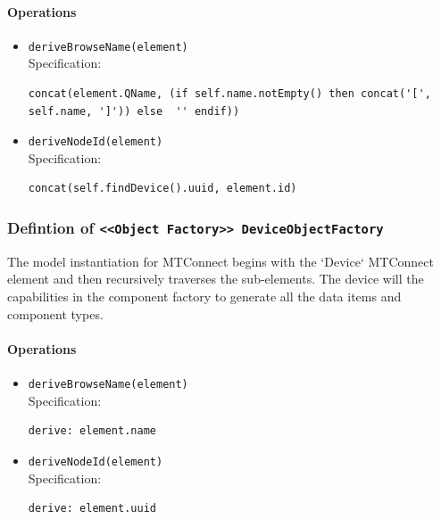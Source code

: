 \paragraph{Operations}
\begin{itemize}
  \item \texttt{deriveBrowseName(element)}\\
    Specification:
   \indent \begin{lstlisting}
concat(element.QName, (if self.name.notEmpty() then concat('[', self.name, ']')) else  '' endif))
\end{lstlisting}

  \item \texttt{deriveNodeId(element)}\\
    Specification:
   \indent \begin{lstlisting}
concat(self.findDevice().uuid, element.id)
\end{lstlisting}

\end{itemize}
\FloatBarrier
\subsubsection{Defintion of \texttt{<<Object Factory>> DeviceObjectFactory}} \label{type:DeviceObjectFactory}

\FloatBarrier

The model instantiation for MTConnect begins with the `Device` MTConnect element and then recursively traverses the sub-elements. The device will the capabilities in the component factory to generate all the data items and component types. 

\paragraph{Operations}
\begin{itemize}
  \item \texttt{deriveBrowseName(element)}\\
    Specification:
   \indent \begin{lstlisting}
derive: element.name
\end{lstlisting}

  \item \texttt{deriveNodeId(element)}\\
    Specification:
   \indent \begin{lstlisting}
derive: element.uuid
\end{lstlisting}

\end{itemize}
